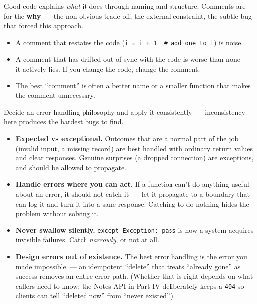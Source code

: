 \label{writing-good-code:comments}

Good code explains \emph{what} it does through naming and structure. Comments are for the \textbf{why}~--- the
non-obvious trade-off, the external constraint, the subtle bug that forced this approach.

\begin{itemize}
\tightlist
\item
  A comment that restates the code (\texttt{i\ =}\allowbreak{}\texttt{\ i\ +\ 1\ \ \#\ add\ one\ to\ i}) is noise.
\item
  A comment that has drifted out of sync with the code is worse than none~--- it actively lies. If you
  change the code, change the comment.
\item
  The best ``comment'' is often a better name or a smaller function that makes the comment unnecessary.
\end{itemize}

\label{writing-good-code:error-handling}

Decide an error-handling philosophy and apply it consistently~--- inconsistency here produces the
hardest bugs to find.

\begin{itemize}
\tightlist
\item
  \textbf{Expected vs exceptional.} Outcomes that are a normal part of the job (invalid input, a missing
  record) are best handled with ordinary return values and clear responses. Genuine surprises (a
  dropped connection) are exceptions, and should be allowed to propagate.
\item
  \textbf{Handle errors where you can act.} If a function can't do anything useful about an error, it
  should not catch it~--- let it propagate to a boundary that can log it and turn it into a sane
  response. Catching to do nothing hides the problem without solving it.
\item
  \textbf{Never swallow silently.} \texttt{except\ Exception:\ pass} is how a system acquires invisible failures.
  Catch \emph{narrowly}, or not at all.
\item
  \textbf{Design errors out of existence.} The best error handling is the error you made impossible~--- an
  idempotent ``delete'' that treats ``already gone'' as success removes an entire error path. (Whether
  that is right depends on what callers need to know; the Notes API in Part IV deliberately keeps a
  \texttt{404} so clients can tell ``deleted now'' from ``never existed''.)
\end{itemize}

